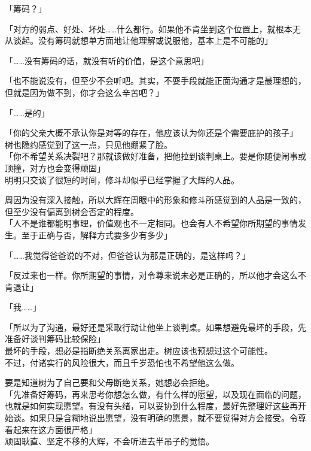 「筹码？」

「对方的弱点、好处、坏处……什么都行。如果他不肯坐到这个位置上，就根本无从谈起。没有筹码就想单方面地让他理解或说服他，基本上是不可能的」

「……没有筹码的话，就没有听的价值，是这个意思吧」

「也不能说没有，但至少不会听吧。其实，不耍手段就能正面沟通才是最理想的，但就是因为做不到，你才会这么辛苦吧？」

「……是的」

「你的父亲大概不承认你是对等的存在，他应该认为你还是个需要庇护的孩子」\\

树也隐约感觉到了这一点，只见他绷紧了脸。\\

「你不希望关系决裂吧？那就该做好准备，把他拉到谈判桌上。要是你随便闹事或顶撞，对方也会变得顽固」\\

明明只交谈了很短的时间，修斗却似乎已经掌握了大辉的人品。

周因为没有深入接触，所以大辉在周眼中的形象和修斗所感觉到的人品是一致的，但至少没有偏离到树会否定的程度。\\

「人不是谁都能明事理，价值观也不一定相同。也会有人不希望你所期望的事情发生。至于正确与否，解释方式要多少有多少」

「……我觉得爸爸说的不对，但爸爸认为那是正确的，是这样吗？」

「反过来也一样。你所期望的事情，对令尊来说未必是正确的，所以他才会这么不肯退让」

「我……」

「所以为了沟通，最好还是采取行动让他坐上谈判桌。如果想避免最坏的手段，先准备好谈判筹码比较保险」\\

最坏的手段，想必是指断绝关系离家出走。树应该也预想过这个可能性。\\

不过，付诸实行的风险很大，而且千岁恐怕也不希望他这么做。

要是知道树为了自己要和父母断绝关系，她想必会拒绝。\\

「先准备好筹码，再来思考你想怎么做，有什么样的愿望，以及现在面临的问题，也就是如何实现愿望。有没有头绪，可以妥协到什么程度，最好先整理好这些再开始谈。如果只是含糊地说出愿望，没有明确的愿景，就不要觉得对方会接受。令尊看起来在这方面很严格」\\

顽固耿直、坚定不移的大辉，不会听进去半吊子的觉悟。\\

